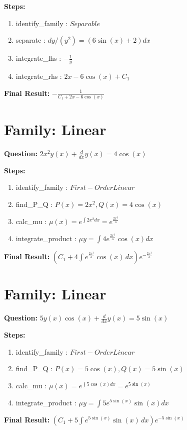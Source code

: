 \documentclass{article}
\begin{document}
\textbf{Steps:}
\begin{enumerate}
\item identify_family :  $Separable$
\item separate :  $dy / (y^{2}) = (6 \sin{\left(x \right)} + 2) dx$
\item integrate_lhs :  $- \frac{1}{y}$
\item integrate_rhs :  $2 x - 6 \cos{\left(x \right)} + C_1$
\end{enumerate}
\textbf{Final Result:} $- \frac{1}{C_{1} + 2 x - 6 \cos{\left(x \right)}}$

\section*{Family: Linear}
\textbf{Question:} $2 x^{2} y{\left(x \right)} + \frac{d}{d x} y{\left(x \right)} = 4 \cos{\left(x \right)}$

\textbf{Steps:}
\begin{enumerate}
\item identify_family :  $First-Order Linear$
\item find_P_Q :  $P(x)=2 x^{2}, Q(x)=4 \cos{\left(x \right)}$
\item calc_mu :  $\mu(x) = e^{\int 2 x^{2} dx} = e^{\frac{2 x^{3}}{3}}$
\item integrate_product :  $\mu y = \int 4 e^{\frac{2 x^{3}}{3}} \cos{\left(x \right)} dx$
\end{enumerate}
\textbf{Final Result:} $\left(C_{1} + 4 \int e^{\frac{2 x^{3}}{3}} \cos{\left(x \right)}\, dx\right) e^{- \frac{2 x^{3}}{3}}$

\section*{Family: Linear}
\textbf{Question:} $5 y{\left(x \right)} \cos{\left(x \right)} + \frac{d}{d x} y{\left(x \right)} = 5 \sin{\left(x \right)}$

\textbf{Steps:}
\begin{enumerate}
\item identify_family :  $First-Order Linear$
\item find_P_Q :  $P(x)=5 \cos{\left(x \right)}, Q(x)=5 \sin{\left(x \right)}$
\item calc_mu :  $\mu(x) = e^{\int 5 \cos{\left(x \right)} dx} = e^{5 \sin{\left(x \right)}}$
\item integrate_product :  $\mu y = \int 5 e^{5 \sin{\left(x \right)}} \sin{\left(x \right)} dx$
\end{enumerate}
\textbf{Final Result:} $\left(C_{1} + 5 \int e^{5 \sin{\left(x \right)}} \sin{\left(x \right)}\, dx\right) e^{- 5 \sin{\left(x \right)}}$
\end{document}
